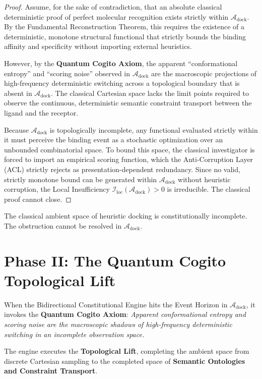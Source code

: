\documentclass[11pt,openany]{extbook}
\theoremstyle{plain}
\theoremstyle{definition}
\begin{document}
\begin{proof}
Assume, for the sake of contradiction, that an absolute classical deterministic proof of perfect molecular recognition exists strictly within $\mathcal{A}_{\text{dock}}$. By the Fundamental Reconstruction Theorem, this requires the existence of a deterministic, monotone structural functional that strictly bounds the binding affinity and specificity without importing external heuristics.

However, by the \textbf{Quantum Cogito Axiom}, the apparent ``conformational entropy'' and ``scoring noise'' observed in $\mathcal{A}_{\text{dock}}$ are the macroscopic projections of high-frequency deterministic switching across a topological boundary that is absent in $\mathcal{A}_{\text{dock}}$. The classical Cartesian space lacks the limit points required to observe the continuous, deterministic semantic constraint transport between the ligand and the receptor.

Because $\mathcal{A}_{\text{dock}}$ is topologically incomplete, any functional evaluated strictly within it must perceive the binding event as a stochastic optimization over an unbounded combinatorial space. To bound this space, the classical investigator is forced to import an empirical scoring function, which the Anti-Corruption Layer (ACL) strictly rejects as presentation-dependent redundancy. Since no valid, strictly monotone bound can be generated within $\mathcal{A}_{\text{dock}}$ without heuristic corruption, the Local Insufficiency $\mathcal{I}_{\text{loc}}(\mathcal{A}_{\text{dock}}) > 0$ is irreducible. The classical proof cannot close.
\end{proof}

The classical ambient space of heuristic docking is constitutionally incomplete. The obstruction cannot be resolved in $\mathcal{A}_{\text{dock}}$.

\section{Phase II: The Quantum Cogito Topological Lift}

When the Bidirectional Constitutional Engine hits the Event Horizon in $\mathcal{A}_{\text{dock}}$, it invokes the \textbf{Quantum Cogito Axiom}: \textit{Apparent conformational entropy and scoring noise are the macroscopic shadows of high-frequency deterministic switching in an incomplete observation space.}

The engine executes the \textbf{Topological Lift}, completing the ambient space from discrete Cartesian sampling to the completed space of \textbf{Semantic Ontologies and Constraint Transport}.
\end{document}
